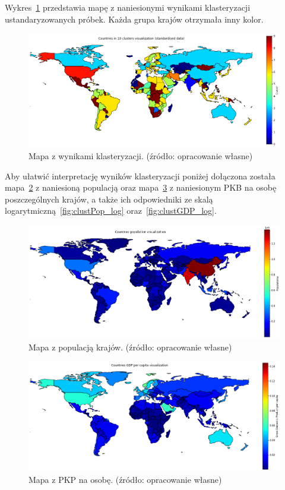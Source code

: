 \documentclass[11pt]{report}
\begin{document}
    Wykres~\ref{fig:clust10std} przedstawia mapę z naniesionymi wynikami klasteryzacji ustandaryzowanych próbek.
    Każda grupa krajów otrzymała inny kolor.

    \begin{figure}[!htp]
        \centering
        \includegraphics[width=1 \textwidth]{fig/CLUST/10clusterMap_std.png}
        \caption{Mapa z wynikami klasteryzacji. (źródło: opracowanie własne)}
        \label{fig:clust10std}
    \end{figure}

    Aby ułatwić interpretację wyników klasteryzacji poniżej dołączona została mapa~\ref{fig:clustPop} z naniesioną populacją oraz mapa~\ref{fig:clustGDP} z naniesionym PKB na osobę poszczególnych krajów, a także ich odpowiedniki ze skalą logarytmiczną~\ref{fig:clustPop_log} oraz~\ref{fig:clustGDP_log}.

    \begin{figure}[!htp]
        \centering
        \includegraphics[width=1 \textwidth]{fig/CLUST/population.png}
        \caption{Mapa z populacją krajów. (źródło: opracowanie własne)}
        \label{fig:clustPop}
    \end{figure}

    \begin{figure}[!htp]
        \centering
        \includegraphics[width=1 \textwidth]{fig/CLUST/gdp.png}
        \caption{Mapa z PKP na osobę. (źródło: opracowanie własne)}
        \label{fig:clustGDP}
    \end{figure}
\end{document}
